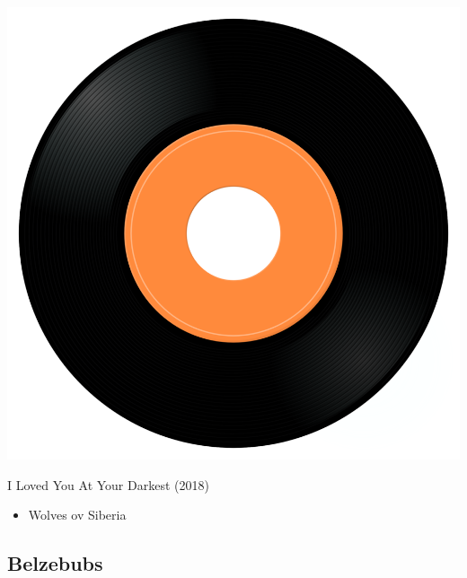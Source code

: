 \begin{minipage}[t]{0.25\textwidth}\vspace{0pt}
\captionsetup{type=figure}
\includegraphics[width=\textwidth]{Images/cover.png}
\caption*{I Loved You At Your Darkest (2018)}
\end{minipage}
\begin{minipage}[t]{0.25\textwidth}\vspace{0pt}
\begin{itemize}[nosep,leftmargin=1em,labelwidth=*,align=left]
	\setlength{\itemsep}{0pt}
	\item Wolves ov Siberia
\end{itemize}
\end{minipage}

\subsection{Belzebubs}

